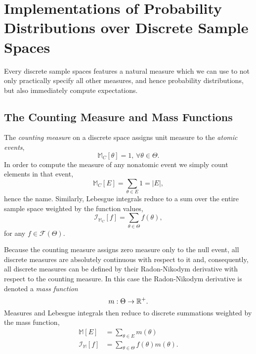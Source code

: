 \section{Implementations of Probability Distributions over
Discrete Sample Spaces}

Every discrete sample spaces features a natural measure
which we can use to not only practically specify all other measures, 
and hence probability distributions, but also immediately compute
expectations.

\subsection{The Counting Measure and Mass Functions}

The \emph{counting measure} on a discrete space assigns unit
measure to the \emph{atomic events},
%
\begin{equation*}
\mathbb{M}_{C} \! \left[ \theta \right] = 1, \, \forall \theta \in \Theta.
\end{equation*}
%
In order to compute the measure of any nonatomic event we simply
count elements in that event,
%
\begin{equation*}
\mathbb{M}_{C} \! \left[ E \right]
=
\sum_{\theta \in E}  1 = \left| E \right|,
\end{equation*}
%
hence the name.  Similarly, Lebesgue integrals reduce to a sum
over the entire sample space weighted by the function values,
%
\begin{equation*}
\mathcal{I}_{\mathbb{M}_{C}} \! \left[ f \right]
=
\sum_{\theta \in \Theta} f \! \left( \theta \right),
\end{equation*}
%
for any $f \in \mathcal{F} \! \left( \Theta \right)$.

Because the counting measure assigns zero measure only to the
null event, all discrete measures are absolutely continuous with
respect to it and, consequently, all discrete measures can be defined
by their Radon-Nikodym derivative with respect to the counting measure.
In this case the Radon-Nikodym derivative is denoted a 
\emph{mass function}
%
\begin{equation*}
m : \Theta \rightarrow \mathbb{R}^{+}.
\end{equation*}
%
Measures and Lebesgue integrals then reduce to discrete summations
weighted by the mass function,
%
\begin{align*}
\mathbb{M} \! \left[ E \right]
&=
\sum_{\theta \in E} m \! \left( \theta \right)
\\
\mathcal{I}_{\mathbb{M}} \! \left[ f \right]
&=
\sum_{\theta \in \Theta} f \! \left( \theta \right) m \! \left( \theta \right).
\end{align*}

